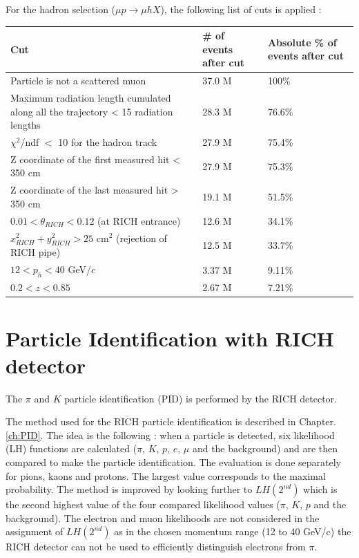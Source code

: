 For the hadron selection ($\mu p \rightarrow \mu hX$), the following list of cuts is applied :
\begin{table}[!h]
  \centering
  \begin{tabular}{p{10cm} p{2cm} p{2cm}}
    \hline
    \hline
     Cut & \# of events after cut & Absolute \% of events after cut  \\
    \hline
    \hline
    Particle is not a scattered muon & 37.0 M & 100\% \\
    Maximum radiation length cumulated along all the trajectory < 15 radiation lengths & 28.3 M & 76.6\% \\
    $\chi^2$/ndf $<$ 10 for the hadron track & 27.9 M & 75.4\% \\
    Z coordinate of the first measured hit < 350 cm & 27.9 M & 75.3\% \\
    Z coordinate of the last measured hit > 350 cm & 19.1 M & 51.5\% \\
    $0.01 < \theta_{RICH} < 0.12$ (at RICH entrance) & 12.6 M & 34.1\% \\
    $x^2_{RICH} + y^2_{RICH} > 25$ cm$^2$ (rejection of RICH pipe) & 12.5 M & 33.7\% \\
    $12 < p_h < 40$ GeV/$c$ & 3.37 M & 9.11\% \\
    $0.2 < z < 0.85$ & 2.67 M & 7.21\% \\
    \hline
    \hline
  \end{tabular}
\end{table}


\section{Particle Identification with RICH detector}

The $\pi$ and $K$ particle identification (PID) is performed by the RICH detector.

The method used for the RICH particle identification is described in Chapter. \ref{ch:PID}. The idea is the following : when a particle is detected, six likelihood (LH) functions are calculated ($\pi$, $K$, $p$, $e$, $\mu$ and the background) and are then compared to make the particle identification. The evaluation is done separately for pions, kaons and protons. The largest value corresponds to the maximal probability. The method is improved by looking further to $LH(2^{nd})$ which is the second highest value of the four compared likelihood values ($\pi$, $K$, $p$ and the background). The electron and muon likelihoods are not considered in the assignment of $LH(2^{nd})$ as in the chosen momentum range (12 to 40 GeV/c) the RICH detector can not be used to efficiently distinguish electrons from $\pi$.

